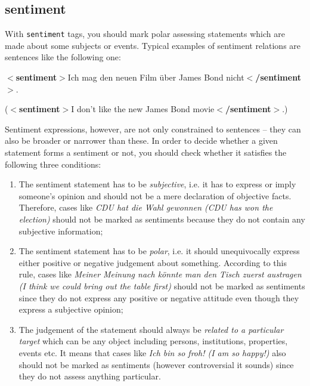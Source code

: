\documentclass[11pt,a4paper]{article}
\newcommand{\xmltag}[1]{{\textbf{\small$<$#1$>$}}}
\newcommand{\sentiment}[1]{\xmltag{sentiment}#1\xmltag{/sentiment}}
\newenvironment{myexe}{
  \begin{exe}
    \ex\begin{center}
    \itshape
}{
    \end{center}
  \end{exe}
}
\begin{document}
\subsection{sentiment}\label{sec:sentiment}
With \texttt{sentiment} tags, you should mark polar assessing statements which
are made about some subjects or events.  Typical examples of sentiment
relations are sentences like the following one:
\begin{myexe}
  \sentiment{Ich mag den neuen Film \"uber James Bond nicht}.

  (\sentiment{I don't like the new James Bond
    movie}.)\label{ex:sentiment}
\end{myexe}
Sentiment expressions, however, are not only constrained to sentences -- they
can also be broader or narrower than these.  In order to decide whether a
given statement forms a sentiment or not, you should check whether it
satisfies the following three conditions:
\begin{enumerate}
  \item The sentiment statement has to be \textit{subjective}, i.e. it has to
    express or imply someone's opinion and should not be a mere declaration of
    objective facts.  Therefore, cases like \textit{CDU hat die Wahl gewonnen
      (CDU has won the election)} should not be marked as sentiments because
    they do not contain any subjective information;

  \item The sentiment statement has to be \textit{polar}, i.e. it should
    unequivocally express either positive or negative judgement about
    something.  According to this rule, cases like \textit{Meiner Meinung nach
      k\"onnte man den Tisch zuerst austragen (I think we could bring out the
      table first)} should not be marked as sentiments since they do not
    express any positive or negative attitude even though they express a
    subjective opinion;

  \item The judgement of the statement should always be \textit{related to a
    particular target} which can be any object including persons,
    institutions, properties, events etc.  It means that cases like
    \textit{Ich bin so froh! (I am so happy!)} also should not be marked as
    sentiments (however controversial it sounds) since they do not assess
    anything particular.
\end{enumerate}
\end{document}
